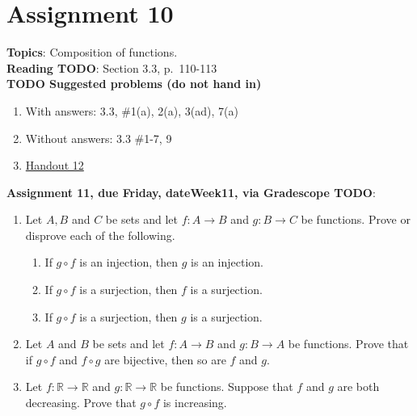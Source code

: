 \documentclass[12pt]{article}
\newcommand{\R}{{\mathbb R}}
\begin{document}
\section[10 (due \csname dateWeek10\endcsname): Composition of functions.]{Assignment 10}

\textbf{Topics}: Composition of functions.
\\

\noindent \textbf{Reading TODO}: Section 3.3, p.~110-113
\\


\noindent \textbf{TODO Suggested problems (do not hand in)}

\begin{enumerate}
\item With answers: 3.3, \#1(a), 2(a), 3(ad), 7(a)
\item Without answers: 3.3 \#1-7, 9
\item \href{https://www.math.emory.edu/~dzb/teaching/250Fall2021/handouts/250-H12-compositions.pdf}{Handout 12}
\end{enumerate}


\noindent \textbf{Assignment 11, due Friday, \csname dateWeek11\endcsname, via Gradescope TODO}:
\begin{enumerate}
\item Let $A, B$ and $C$ be sets and let $f \colon A \to B$ and $g \colon B \to C$ be functions. Prove or disprove each of the following.
 \begin{enumerate}
 \item If $g\circ f$ is an injection, then $g$ is an injection.
 \item If $g\circ f$ is a surjection, then $f$ is a surjection.
 \item If $g\circ f$ is a surjection, then $g$ is a surjection.
 \end{enumerate}
\item Let $A$ and $B$ be sets and let $f \colon A \to B$ and $g \colon B \to A$ be functions. Prove that if $g \circ f$ and $f \circ g$ are bijective, then so are $f$ and $g$.

 \item Let $f \colon \R \to \R$ and $g \colon \R \to \R$ be functions. Suppose that $f$ and $g$ are both decreasing. Prove that $g \circ f$ is increasing.
 \end{enumerate}



\newpage
\end{document}
